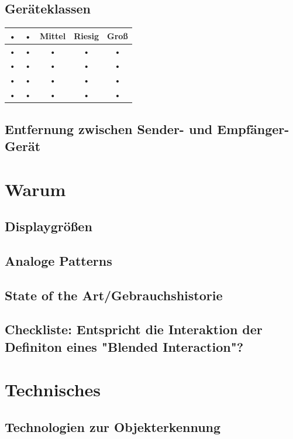 \subsection*{Geräteklassen}
\begin{tabular}{|c|c|c|c|c|}
\hline 
• & • & Mittel & Riesig & Groß \\ 
\hline 
• & • & • & • & • \\ 
\hline 
• & • & • & • & • \\ 
\hline 
• & • & • & • & • \\ 
\hline 
• & • & • & • & • \\ 
\hline 
\end{tabular} 

\subsection*{Entfernung zwischen Sender- und Empfänger-Gerät}



\section*{Warum}


\subsection*{Displaygrößen}


\subsection*{Analoge Patterns}


\subsection*{State of the Art/Gebrauchshistorie}


\subsection*{Checkliste: Entspricht die Interaktion der Definiton eines "Blended Interaction"?}


\section*{Technisches}

\subsection*{Technologien zur Objekterkennung}


